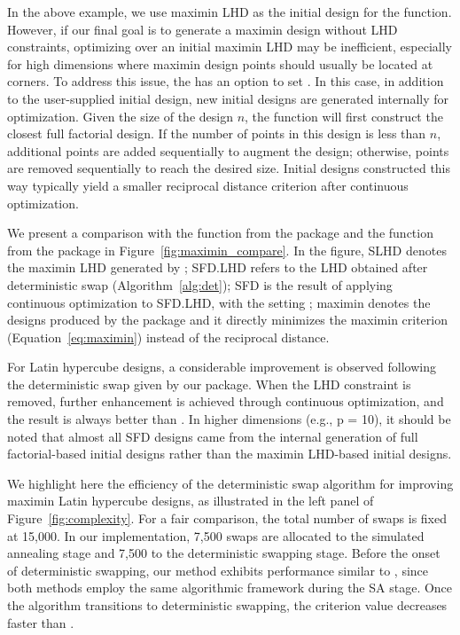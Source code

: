 In the above example, we use maximin LHD as the initial design for the  function. However, if our final goal is to generate a maximin design without LHD constraints, optimizing over an initial maximin LHD may be inefficient, especially for high dimensions where maximin design points should usually be located at corners. To address this issue, the  has an option to set . In this case, in addition to the user-supplied initial design, new initial designs are generated internally for optimization. Given the size of the design $n$, the function will first construct the closest full factorial design. If the number of points in this design is less than $n$, additional points are added sequentially to augment the design; otherwise, points are removed sequentially  to reach the desired size. Initial designs constructed this way typically yield a smaller reciprocal distance criterion after continuous optimization.

We present a comparison with the  function from the  package \citep{SLHD} and the  function from the  package \citep{maximin} in Figure~\ref{fig:maximin_compare}. In the figure, SLHD denotes the maximin LHD generated by ; SFD.LHD refers to the LHD obtained after deterministic swap (Algorithm~\ref{alg:det}); SFD is the result of applying continuous optimization to SFD.LHD, with the setting ; maximin denotes the designs produced by the  package and it directly minimizes the maximin criterion (Equation~\ref{eq:maximin}) instead of the reciprocal distance.

For Latin hypercube designs, a considerable improvement is observed following the deterministic swap given by our package. When the LHD constraint is removed, further enhancement is achieved through continuous optimization, and the result is always better than . In higher dimensions (e.g., p = 10), it should be noted that almost all SFD designs came from the internal generation of full factorial-based initial designs rather than the maximin LHD-based initial designs.

We highlight here the efficiency of the deterministic swap algorithm for improving maximin Latin hypercube designs, as illustrated in the left panel of Figure~\ref{fig:complexity}.
For a fair comparison, the total number of swaps is fixed at 15,000. In our implementation, 7,500 swaps are allocated to the simulated annealing stage and 7,500 to the deterministic swapping stage.
Before the onset of deterministic swapping, our method exhibits performance similar to , since both methods employ the same algorithmic framework during the SA stage. Once the algorithm transitions to deterministic swapping, the criterion value decreases faster than .

